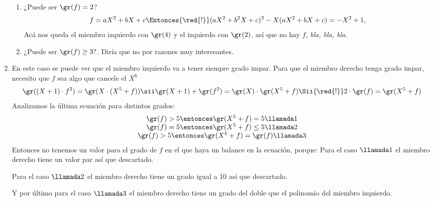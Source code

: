\begin{enumerate}[label=\roman*)]
\begin{enumerate}[label=\tiny\faIcon{calculator}$_{\arabic*}$)]
          \item ¿Puede ser $\gr(f) = 2$?
                $$
                  f = aX^2 + bX + c \Entonces{\red{!}} (aX^2 + b^2X + c)^2  - X(aX^2 + bX + c) = -X^2 + 1,
                $$
                Acá nos queda el miembro izquierdo con $\gr(4)$ y el izquierdo con $\gr(2)$, así que no hay $f$, \textit{bla, bla, bla}.

          \item ¿Puede ser $\gr(f) \geq 3?$. Diría que no por razones muy interesantes.

        \end{enumerate}

  \item En este caso se puede ver que el miembro izquierdo va a tener siempre grado impar. Para que el miembro derecho tenga grado impar,
        necesito que $f$ sea algo que cancele el $X^6$
        $$
          \gr((X+1)\cdot f^2) = \gr(X\cdot (X^5 + f))
          \sii
          \gr(X+1) + \gr(f^2) = \gr(X) \cdot \gr(X^5 + f)
          \Sii{\red{!}}
          2 \cdot \gr(f) =\gr(X^5 + f)
        $$
        Analizamos la última ecuación para distintos grados:
        $$
          \begin{array}{c}
            \gr(f) > 5 \entonces \gr(X^5 + f) = 5 \llamada1    \\
            \gr(f) = 5 \entonces \gr(X^5 + f) \leq 5 \llamada2 \\
            \gr(f) > 5 \entonces \gr(X^5 + f) = \gr(f) \llamada3
          \end{array}
        $$
        Entonces no tenemos un valor para el grado de $f$ en el que haya un balance en la ecuación, porque:
        Para el caso $\llamada1$ el miembro derecho tiene un valor par
        así que descartado.\par
        Para el caso $\llamada2$ el miembro derecho tiene un grado igual a 10 así que descartado.\par
        Y por último para el caso $\llamada3$ el miembro derecho tiene un grado del doble que el polinomio del miembro izquierdo.\par


\end{enumerate}

